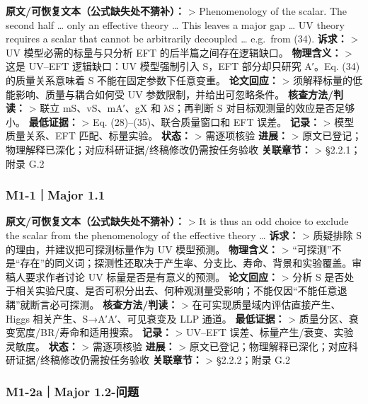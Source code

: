 \documentclass[
]{article}
\begin{document}
\textbf{原文/可恢复文本（公式缺失处不猜补）：} \textgreater{}
Phenomenology of the scalar. The second half \ldots{} only an effective
theory \ldots{} This leaves a major gap \ldots{} UV theory requires a
scalar that cannot be arbitrarily decoupled \ldots{} e.g.~from (34).
\textbf{诉求：} \textgreater{} UV 模型必需的标量与只分析 EFT
的后半篇之间存在逻辑缺口。 \textbf{物理含义：} \textgreater{} 这是
UV--EFT 逻辑缺口：UV 模型强制引入 S，EFT 部分却只研究 A′。Eq. (34)
的质量关系意味着 S 不能在固定参数下任意变重。 \textbf{论文回应：}
\textgreater{} 须解释标量的低能影响、质量与耦合如何受 UV
参数限制，并给出可忽略条件。 \textbf{核查方法/判读：} \textgreater{}
联立 mS、vS、mA′、gX 和 λS；再判断 S 对目标观测量的效应是否足够小。
\textbf{最低证据：} \textgreater{} Eq. (28)--(35)、联合质量窗口和 EFT
误差。 \textbf{记录：} \textgreater{} 模型质量关系、EFT 匹配、标量实验。
\textbf{状态：} \textgreater{} 需逐项核验 \textbf{进展：} \textgreater{}
原文已登记；物理解释已深化；对应科研证据/终稿修改仍需按任务验收
\textbf{关联章节：} \textgreater{} §2.2.1；附录 G.2

\subsubsection{M1-1｜Major 1.1}\label{m1-1major-1.1}

\textbf{原文/可恢复文本（公式缺失处不猜补）：} \textgreater{} It is thus
an odd choice to exclude the scalar from the phenomenology of the
effective theory \ldots{} \textbf{诉求：} \textgreater{} 质疑排除 S
的理由，并建议把可探测标量作为 UV 模型预测。 \textbf{物理含义：}
\textgreater{}
``可探测''不是``存在''的同义词；探测性还取决于产生率、分支比、寿命、背景和实验覆盖。审稿人要求作者讨论
UV 标量是否是有意义的预测。 \textbf{论文回应：} \textgreater{} 分析 S
是否处于相关实验尺度、是否可积分出去、何种观测量受影响；不能仅因``不能任意退耦''就断言必可探测。
\textbf{核查方法/判读：} \textgreater{}
在可实现质量域内评估直接产生、Higgs 相关产生、S→A′A′、可见衰变及 LLP
通道。 \textbf{最低证据：} \textgreater{}
质量分区、衰变宽度/BR/寿命和适用搜索。 \textbf{记录：} \textgreater{}
UV--EFT 误差、标量产生/衰变、实验灵敏度。 \textbf{状态：} \textgreater{}
需逐项核验 \textbf{进展：} \textgreater{}
原文已登记；物理解释已深化；对应科研证据/终稿修改仍需按任务验收
\textbf{关联章节：} \textgreater{} §2.2.2；附录 G.2

\subsubsection{M1-2a｜Major 1.2-问题}\label{m1-2amajor-1.2-ux95eeux9898}
\end{document}
